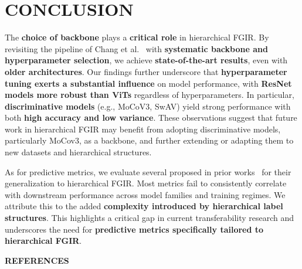 \documentclass[10pt,twocolumn]{article}
\begin{document}
\section{CONCLUSION}
The \textbf{choice of backbone} plays a \textbf{critical role} in hierarchical FGIR. By revisiting the pipeline of Chang et al.~\cite{chang_your_2021} with \textbf{systematic backbone and hyperparameter selection}, we achieve \textbf{state-of-the-art results}, even with \textbf{older architectures}. Our findings further underscore that \textbf{hyperparameter tuning exerts a substantial influence} on model performance, with \textbf{ResNet models more robust than ViTs} regardless of hyperparameters. In particular, \textbf{discriminative models} (e.g., MoCoV3, SwAV) yield strong performance with both \textbf{high accuracy and low variance}. These observations suggest that future work in hierarchical FGIR may benefit from adopting discriminative models, particularly MoCov3, as a backbone, and further extending or adapting them to new datasets and hierarchical structures.

As for predictive metrics, we evaluate several proposed in prior works~\cite{kornblith_better_2019, nayman_diverse_2022} for their generalization to hierarchical FGIR. Most metrics fail to consistently correlate with downstream performance across model families and training regimes.  We attribute this to the added \textbf{complexity introduced by hierarchical label structures}. This highlights a critical gap in current transferability research and underscores the need for \textbf{predictive metrics specifically tailored to hierarchical FGIR}.

\begin{center}
\textbf{REFERENCES}
\vspace{-0.2cm}
\end{center}
\vspace{-3.25em}  %


\end{document}
